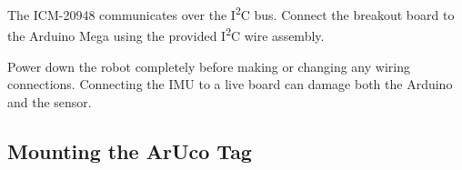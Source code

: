 \documentclass[12pt,letterpaper]{article}
\newcommand{\diagramplaceholder}[2][4cm]{%
  \begin{center}
    \fbox{\begin{minipage}{0.85\textwidth}
      \vspace{#1}
      \centering\textit{[Diagram: #2]}
      \vspace{#1}
    \end{minipage}}
  \end{center}
}
\begin{document}
The ICM-20948 communicates over the I\textsuperscript{2}C bus.
Connect the breakout board to the Arduino Mega using the provided
I\textsuperscript{2}C wire assembly.

\begin{warningbox}
  Power down the robot completely before making or changing any wiring
  connections. Connecting the IMU to a live board can damage both the
  Arduino and the sensor.
\end{warningbox}




\subsection{Mounting the ArUco Tag}
\end{document}
